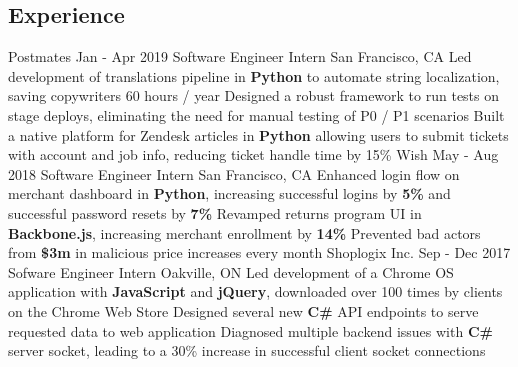 \documentclass[]{aanguyen_res}
\begin{document}
	\begin{main}%
		\vspace{35pt}%
		\section{Experience}
			\mainentry%
				{Postmates}%
				{Jan - Apr 2019}%
				{Software Engineer Intern}%
				{San Francisco, CA}%
				{\faCaretRight Led development of translations pipeline in \textbf{Python} to automate string localization, saving copywriters 60 hours / year
				  \faCaretRight Designed a robust framework to run tests on stage deploys, eliminating the need for manual testing of P0 / P1 scenarios
				  \faCaretRight Built a native platform for Zendesk articles in \textbf{Python} allowing users to submit tickets with account and job info, reducing ticket handle time by 15\%}
			\vspace{0.1cm}%
			\mainentry%
				{Wish}%
				{May - Aug 2018}%
				{Software Engineer Intern}%
				{San Francisco, CA}%
				{\faCaretRight Enhanced login flow on merchant dashboard in \textbf{Python}, increasing successful logins by \textbf{5\%} and successful password resets by \textbf{7\%}
				\faCaretRight Revamped returns program UI in \textbf{Backbone.js}, increasing merchant enrollment by \textbf{14\%}
				\faCaretRight Prevented bad actors from \textbf{\$3m} in malicious price increases every month}
			\vspace{0.1cm}%
			\mainentry%
				{Shoplogix Inc.}%
				{Sep - Dec 2017}%
				{Sofware Engineer Intern}%
				{Oakville, ON}%
				{\faCaretRight Led development of a Chrome OS application with \textbf{JavaScript} and \textbf{jQuery}, downloaded over 100 times by clients on the Chrome Web Store
				\faCaretRight Designed several new \textbf{C\#} API endpoints to serve requested data to web application
				\faCaretRight Diagnosed multiple backend issues with \textbf{C\#} server socket, leading to a 30\% increase in successful client socket connections}
			\vspace{0.30cm}%

\end{main}
\end{document}
